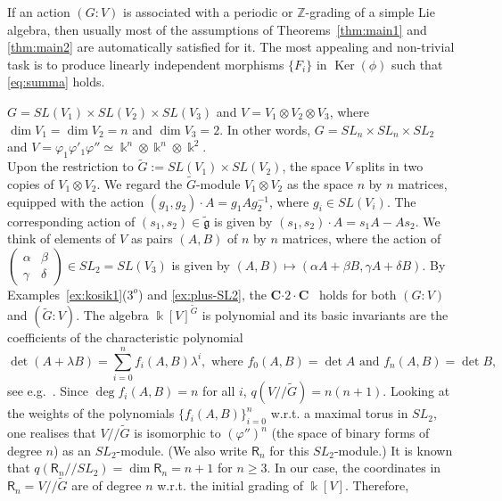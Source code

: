 \noindent
If an action $(G:V)$ is associated with a periodic or ${{\mathbb Z}}$-grading of a simple Lie algebra, 
then usually most of the assumptions of Theorems~\ref{thm:main1} and \ref{thm:main2} are automatically 
satisfied for it. The most appealing and non-trivial task is to produce linearly independent morphisms 
$\{F_i\}$ in ${\operatorname{Ker}}(\phi)$ such that \eqref{eq:summa} holds.

\begin{ex}   \label{ex:tri-SL} $G=SL(V_1){\times} SL(V_2){\times} SL(V_3)$ and  
$V=V_1{\otimes} V_2{\otimes} V_3$, where $\dim V_1=\dim V_2=n$ and $\dim V_3=2$. In other words,
$G=SL_n{\times} SL_n{\times}SL_2$ and $V={\varphi}_1{\varphi}'_1{\varphi}''\simeq {\Bbbk}^n\otimes{\Bbbk}^n\otimes {\Bbbk}^2$.
\\ \indent Upon the 
restriction to $\tilde G:=SL(V_1)\times SL(V_2)$, the space $V$ splits in two copies of $V_1\otimes V_2$. We regard the $\tilde G$-module $V_1\otimes V_2$ as the space $n$ by $n$ matrices, 
equipped with the action $(g_1,g_2){\cdot}A=g_1 Ag_2^{-1}$, where $g_i\in SL(V_i)$. The 
corresponding action of $(s_1,s_2)\in\tilde {{\mathfrak g}}$ is given by $(s_1,s_2){\cdot}A=s_1 A-As_2$. We think of elements
of $V$ as pairs $(A,B)$ of $n$ by $n$ matrices, where the action of 
$\left(\begin{array}{cc} {\alpha} & \beta \\ \gamma & \delta \end{array}\right)\in SL_2=SL(V_3)$ is given by 
$(A,B)\mapsto ({\alpha} A+\beta B, \gamma A+\delta B)$. By Examples~\ref{ex:kosik1}($3^o$) and \ref{ex:plus-SL2}, 
the {\textsf{\bfseries C${\cdot}2{\cdot}$C}\ } holds for both $(G:V)$ and $(\tilde G:V)$.
The algebra ${\Bbbk}[V]^{\tilde G}$ is polynomial and its
basic invariants are the coefficients of the characteristic polynomial 
\[
   \det (A+{\lambda} B)=\sum_{i=0}^n f_i(A,B){\lambda}^i, \text{ where  $f_0(A,B)=\det A$ and $f_n(A,B)=\det B$},
\]
see  e.g.~\cite[Theorem\,4]{pervushin02}.
Since $\deg f_i(A,B)=n$ for all $i$, $q(V{/\!\!/} \tilde G)=n(n+1)$. Looking at the weights of the 
polynomials $\{f_i(A,B)\}_{i=0}^n$ w.r.t. a maximal torus in $SL_2$, one realises that 
$V{/\!\!/}\tilde G$ is isomorphic to $({\varphi}'')^n$ (the space of binary forms of degree $n$) as an $SL_2$-module. 
(We also write ${\mathsf{R}}_n$ for this $SL_2$-module.) It is known that  
$q({\mathsf{R}} _n{/\!\!/} SL_2)=\dim {\mathsf{R}} _n=n+1$ for $n{\geqslant} 3$. In our case, the coordinates in ${\mathsf{R}} _n=V{/\!\!/} \tilde G$ 
are of degree $n$ w.r.t. the initial grading of ${\Bbbk}[V]$. Therefore, 

\end{ex}

